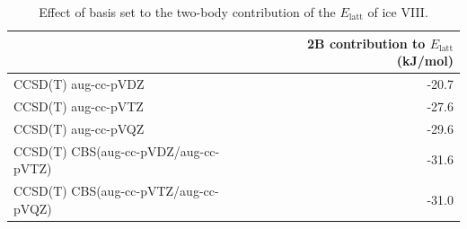 \begin{table}[h]

\caption{\label{tab:basis_effect}Effect of basis set to the two-body contribution of the $E_\text{latt}$ of ice VIII.}
\begin{tabular}{lr}
\toprule
 & 2B contribution to $E_\text{latt}$ (kJ/mol) \\ 
\midrule
CCSD(T) aug-cc-pVDZ & -20.7 \\
CCSD(T) aug-cc-pVTZ & -27.6 \\
CCSD(T) aug-cc-pVQZ & -29.6 \\
CCSD(T) CBS(aug-cc-pVDZ/aug-cc-pVTZ) & -31.6 \\
CCSD(T) CBS(aug-cc-pVTZ/aug-cc-pVQZ) & -31.0 \\
\bottomrule
\end{tabular}

\end{table}